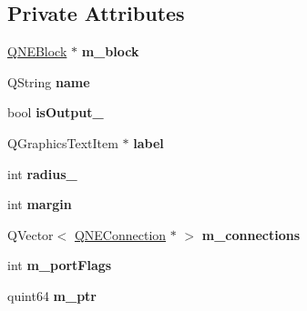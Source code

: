 \subsection*{Private Attributes}
\begin{DoxyCompactItemize}
\item 
\hypertarget{class_q_n_e_port_ae826423b46dd47f18ca369db72829bac}{\hyperlink{class_q_n_e_block}{Q\-N\-E\-Block} $\ast$ {\bfseries m\-\_\-block}}\label{class_q_n_e_port_ae826423b46dd47f18ca369db72829bac}

\item 
\hypertarget{class_q_n_e_port_a24cf1081d500ccc82db1872090a2a957}{Q\-String {\bfseries name}}\label{class_q_n_e_port_a24cf1081d500ccc82db1872090a2a957}

\item 
\hypertarget{class_q_n_e_port_aec718e2f28a26e05ac3c04ec1437a332}{bool {\bfseries is\-Output\-\_\-}}\label{class_q_n_e_port_aec718e2f28a26e05ac3c04ec1437a332}

\item 
\hypertarget{class_q_n_e_port_a9cf8c5494c6f3391f8ae3dd1df53ef90}{Q\-Graphics\-Text\-Item $\ast$ {\bfseries label}}\label{class_q_n_e_port_a9cf8c5494c6f3391f8ae3dd1df53ef90}

\item 
\hypertarget{class_q_n_e_port_a9cf231612c975ffa8ea580af37e11930}{int {\bfseries radius\-\_\-}}\label{class_q_n_e_port_a9cf231612c975ffa8ea580af37e11930}

\item 
\hypertarget{class_q_n_e_port_adfbd9af7053a68e3fe575ec2c7ba34c1}{int {\bfseries margin}}\label{class_q_n_e_port_adfbd9af7053a68e3fe575ec2c7ba34c1}

\item 
\hypertarget{class_q_n_e_port_a560d3979694649c274e6ac9ce3bf64bc}{Q\-Vector$<$ \hyperlink{class_q_n_e_connection}{Q\-N\-E\-Connection} $\ast$ $>$ {\bfseries m\-\_\-connections}}\label{class_q_n_e_port_a560d3979694649c274e6ac9ce3bf64bc}

\item 
\hypertarget{class_q_n_e_port_a02664b5f37d8adf647d6c6fcd42e2d43}{int {\bfseries m\-\_\-port\-Flags}}\label{class_q_n_e_port_a02664b5f37d8adf647d6c6fcd42e2d43}

\item 
\hypertarget{class_q_n_e_port_adc71781b153c8c5a26d62323756f4a7a}{quint64 {\bfseries m\-\_\-ptr}}\label{class_q_n_e_port_adc71781b153c8c5a26d62323756f4a7a}


\end{DoxyCompactItemize}
